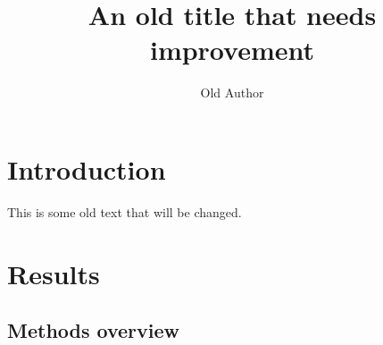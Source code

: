 \documentclass{article}
\title{An old title that needs improvement}
\author{Old Author}
\begin{document}
\maketitle

\begin{abstract}
\end{abstract}


\section*{Introduction}







This is some old text that will be changed.

\section*{Results}

\subsection*{Methods overview}



\end{document}
